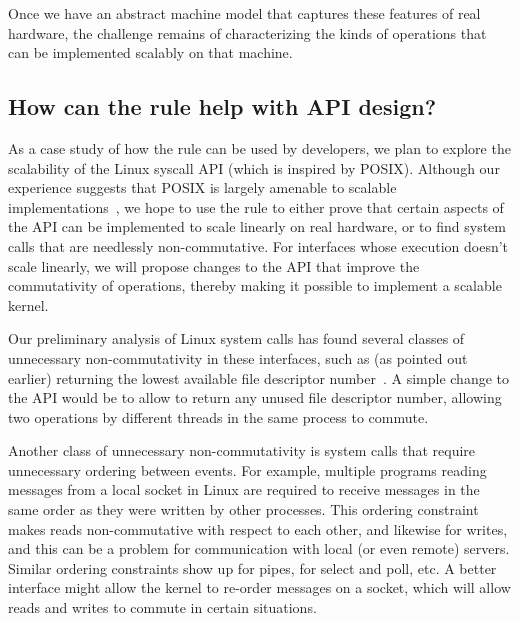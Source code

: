 Once we have an abstract machine model that captures these features of
real hardware, the challenge remains of characterizing the kinds of
operations that can be implemented scalably on that machine.


\subsection{How can the rule help with API design?}
\label{sec:api}

As a case study of how the rule can be used by developers, we plan to
explore the scalability of the Linux syscall API (which is inspired
by POSIX).  Although our experience suggests that POSIX is largely
amenable to scalable implementations~\cite{boyd-wickizer:scaling}, we hope
to use the rule to either prove that certain aspects of the API can be
implemented to scale linearly on real hardware, or to find system calls
that are needlessly non-commutative.  For interfaces whose execution
doesn't scale linearly, we will propose changes to the API that improve
the commutativity of operations, thereby making it possible to implement
a scalable kernel.

Our preliminary analysis of Linux system calls has found several
classes of unnecessary non-commutativity in these interfaces, such as
(as pointed out earlier)  returning the lowest available
file descriptor number~\cite{boyd-wickizer:corey}.
%
A simple change to the API would be to allow  to return any
unused file descriptor number, allowing two  operations by
different threads in the same process to commute.

Another class of unnecessary non-commutativity is system calls that
require unnecessary ordering between events.  For example, multiple
programs reading messages from a local socket in Linux are required
to receive messages in the same order as they were written by other
processes.  This ordering constraint makes reads non-commutative with
respect to each other, and likewise for writes, and this can be a problem
for communication with local (or even remote) servers.  Similar ordering
constraints show up for pipes, for select and poll, etc.  A better
interface might allow the kernel to re-order messages on a socket,
which will allow reads and writes to commute in certain situations.

